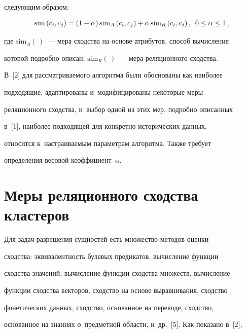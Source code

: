 сле\-ду\-ющим образом:


  \begin{equation}


  \mathrm{sim}\left(c_i, c_j\right) =(1-\alpha) \,\mathrm{sim}_A\left(c_i, c_j\right) +\alpha\,


\mathrm{sim}_R\left(c_i,c_j\right),\enskip 0\leq \alpha\leq 1\,,


  \label{e1-ad}


  \end{equation}


где $\mathrm{sim}_A(\,)$~--- мера сходства на основе атрибутов, способ вы\-чис\-ле\-ния 


которой по\-дроб\-но описан;  $\mathrm{sim}_R(\,)$~--- мера реляционного сходства. 


  


  В~[2] для рассматриваемого алгоритма были обоснованы как наиболее 


подходящие, адаптированы и~модифицированы некоторые меры 


реляционного сходства, и~выбор одной из этих мер, подробно описанных 


в~[1], наиболее под\-хо\-дя\-щей для кон\-крет\-но-ис\-то\-ри\-че\-ских данных, 


относится к~на\-стра\-и\-ва\-емым па\-ра\-мет\-рам алгоритма. Так\-же требует 


определения весовой коэффициент~$\alpha$.





\section{Меры реляционного сходства кластеров}





  Для задач разрешения сущностей есть множество методов оценки 


сходства: эквивалентность булевых предикатов, вычисление функции 


сходства значений, вы\-чис\-ле\-ние функции сходства множеств, вычисление 


функции сходства векторов, сходство на основе выравнивания, сходство 


фонетических данных, сходство, основанное на переводе, сходство, 


основанное на знаниях о~предметной об\-ласти, и~др.~[5]. Как показано в~[2], 


